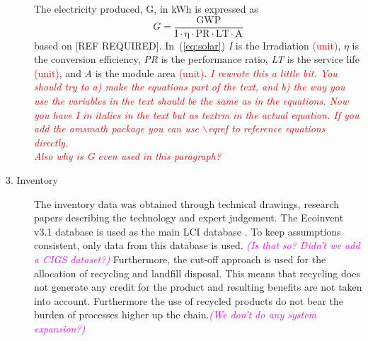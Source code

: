 \begin{description}
The electricity produced, G, in kWh is expressed as
\begin{equation}
G=\frac{{\mathrm{GWP}}}{{\mathrm{I \cdot \eta  \cdot PR \cdot LT \cdot A}}}
\label{eq:solar}
\end{equation}
based on [REF REQUIRED]. In~(\ref{eq:solar}) \textit{I} is the Irradiation \textcolor{red}{(unit)}, ${\eta}$ is the conversion efficiency, \textit{PR} is the performance ratio, \textit{LT} is the service life \textcolor{red}{(unit)}, and \textit{A} is the module area \textcolor{red}{(unit)}.
\textcolor{red}{\textit{I rewrote this a little bit. You should try to a) make the equations part of the text, and b) the way you use the variables in the text should be the same as in the equations. Now you have I in italics in the text but as textrm in the actual equation. If you add the amsmath package you can use $\backslash$eqref to reference equations directly.\\
Also why is G even used in this paragraph?}}



\item[3. Inventory] The inventory data was obtained through technical drawings, research papers describing the technology and expert judgement. The Ecoinvent v3.1 database is used as the main LCI database \cite{frischknecht2005ecoinvent}. To keep assumptions consistent, only data from this database is used. \textcolor{magenta}{\textit{(Is that so? Didn't we add a CIGS dataset?)}} Furthermore, the cut-off approach is used for the allocation of recycling and landfill disposal. This means that recycling does not generate any credit for the product and resulting benefits are not taken into account. Furthermore the use of recycled products do not bear the burden of processes higher up the chain.\textcolor{magenta}{\textit{(We don't do any system expansion?)}}\\




\end{description}
